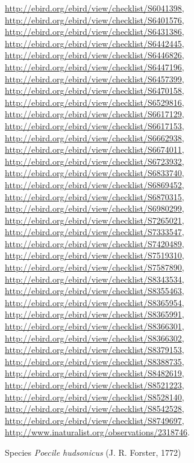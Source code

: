 \documentclass[9pt, article]{memoir}
\begin{document}
\begin{multicols}{2}
\url{http://ebird.org/ebird/view/checklist/S6041398}, 
\url{http://ebird.org/ebird/view/checklist/S6401576}, 
\url{http://ebird.org/ebird/view/checklist/S6431386}, 
\url{http://ebird.org/ebird/view/checklist/S6442445}, 
\url{http://ebird.org/ebird/view/checklist/S6446826}, 
\url{http://ebird.org/ebird/view/checklist/S6447196}, 
\url{http://ebird.org/ebird/view/checklist/S6457399}, 
\url{http://ebird.org/ebird/view/checklist/S6470158}, 
\url{http://ebird.org/ebird/view/checklist/S6529816}, 
\url{http://ebird.org/ebird/view/checklist/S6617129}, 
\url{http://ebird.org/ebird/view/checklist/S6617153}, 
\url{http://ebird.org/ebird/view/checklist/S6662938}, 
\url{http://ebird.org/ebird/view/checklist/S6674011}, 
\url{http://ebird.org/ebird/view/checklist/S6723932}, 
\url{http://ebird.org/ebird/view/checklist/S6833740}, 
\url{http://ebird.org/ebird/view/checklist/S6869452}, 
\url{http://ebird.org/ebird/view/checklist/S6870315}, 
\url{http://ebird.org/ebird/view/checklist/S6980299}, 
\url{http://ebird.org/ebird/view/checklist/S7265021}, 
\url{http://ebird.org/ebird/view/checklist/S7333547}, 
\url{http://ebird.org/ebird/view/checklist/S7420489}, 
\url{http://ebird.org/ebird/view/checklist/S7519310}, 
\url{http://ebird.org/ebird/view/checklist/S7587890}, 
\url{http://ebird.org/ebird/view/checklist/S8343534}, 
\url{http://ebird.org/ebird/view/checklist/S8355463}, 
\url{http://ebird.org/ebird/view/checklist/S8365954}, 
\url{http://ebird.org/ebird/view/checklist/S8365991}, 
\url{http://ebird.org/ebird/view/checklist/S8366301}, 
\url{http://ebird.org/ebird/view/checklist/S8366302}, 
\url{http://ebird.org/ebird/view/checklist/S8379153}, 
\url{http://ebird.org/ebird/view/checklist/S8388735}, 
\url{http://ebird.org/ebird/view/checklist/S8482619}, 
\url{http://ebird.org/ebird/view/checklist/S8521223}, 
\url{http://ebird.org/ebird/view/checklist/S8528140}, 
\url{http://ebird.org/ebird/view/checklist/S8542528}, 
\url{http://ebird.org/ebird/view/checklist/S8749697}, 
\url{http://www.inaturalist.org/observations/2318746}.

\vspace{6pt}\noindent\hspace{36pt}Species \textit{Poecile hudsonicus} (J. R. Forster, 1772)



\end{multicols}
\end{document}
